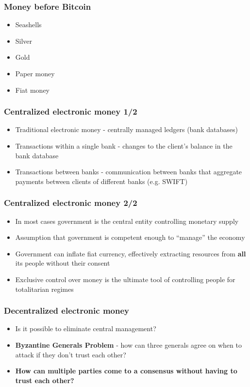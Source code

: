 \documentclass{beamer}
\begin{document}
\begin{frame}
  \frametitle{Money before Bitcoin}
  \begin{itemize}
  \item Seashells
  \item Silver
  \item Gold
  \item Paper money
  \item Fiat money
  \end{itemize}
\end{frame}

\begin{frame}
  \frametitle{Centralized electronic money 1/2}
  \begin{itemize}
  \item Traditional electronic money - centrally managed ledgers (bank
    databases)
  \item Transactions within a single bank - changes to the client's balance in
    the bank database
  \item Transactions between banks - communication between banks that aggregate
    payments between clients of different banks (e.g. SWIFT)
  \end{itemize}
\end{frame}

\begin{frame}
  \frametitle{Centralized electronic money 2/2}
  \begin{itemize}
  \item In most cases government is the central entity controlling monetary
    supply
  \item Assumption that government is competent enough to ``manage'' the economy
  \item Government can inflate fiat currency, effectively extracting resources
    from \textbf{all} its people without their consent
  \item Exclusive control over money is the ultimate tool of controlling people
    for totalitarian regimes
  \end{itemize}
\end{frame}

\begin{frame}
  \frametitle{Decentralized electronic money}
  \begin{itemize}
  \item Is it possible to eliminate central management?
  \item \textbf{Byzantine Generals Problem} - how can three generals agree on when
    to attack if they don't trust each other?
  \item \textbf{How can multiple parties come to a consensus without having to
      trust each other?}
  \end{itemize}
\end{frame}
\end{document}
